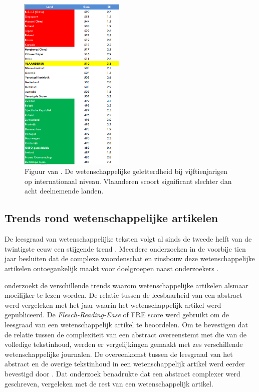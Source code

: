 \begin{figure}[H]
	\begin{center}
		\includegraphics[width=5cm]{img/oeso-graphic-wetenschappelijke-geletterdheid-2.png}
	\end{center}
	\caption{Figuur van \textcite{DeMeyer2019}. De wetenschappelijke geletterdheid bij vijftienjarigen op internationaal niveau. Vlaanderen scoort significant slechter dan acht deelnemende landen.}
\end{figure}


\subsection{Trends rond wetenschappelijke artikelen}

De leesgraad van wetenschappelijke teksten volgt al sinds de tweede helft van de twintigste eeuw een stijgende trend \autocite{Hayes1992}. Meerdere onderzoeken in de voorbije tien jaar besluiten dat de complexe woordenschat en zinsbouw deze wetenschappelijke artikelen ontoegankelijk maakt voor doelgroepen naast onderzoekers \autocite{Ball2017, PlavenSigray2017, Jones2019}. 


\textcite{PlavenSigray2017} onderzoekt de verschillende trends waarom wetenschappelijke artikelen alsmaar moeilijker te lezen worden. De relatie tussen de leesbaarheid van een abstract werd vergeleken met het jaar waarin het wetenschappelijk artikel werd gepubliceerd. De \textit{Flesch-Reading-Ease} of FRE score werd gebruikt om de leesgraad van een wetenschappelijk artikel te beoordelen. Om te bevestigen dat de relatie tussen de complexiteit van een abstract overeenstemt met die van de volledige tekstinhoud, werden er vergelijkingen gemaakt met zes verschillende wetenschappelijke journalen. De overeenkomst tussen de leesgraad van het abstract en de overige tekstinhoud in een wetenschappelijk artikel werd eerder bevestigd door \textcite{Dronberger1975}. Dat onderzoek benadrukte dat een abstract complexer werd geschreven, vergeleken met de rest van een wetenschappelijk artikel.

